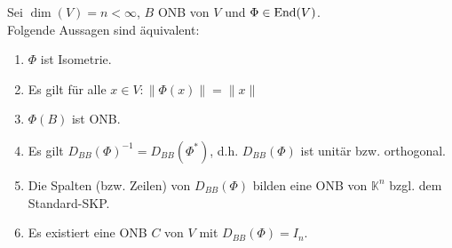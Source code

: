 \documentclass[parskip,a4paper,twoside,DIV15,BCOR12mm]{scrbook}
\begin{document}
\begin{corollary}
Sei $\dim(V)=n<\infty$, $B$ ONB von $V$ und $\Phi\in\operatorname{End}(V)$.\\
Folgende Aussagen sind äquivalent:
\begin{enumerate}
\item $\Phi$ ist Isometrie.
\item Es gilt für alle $x\in V:\|\Phi(x)\|=\|x\|$
\item $\Phi(B)$ ist ONB.
\item Es gilt $D_{BB}(\Phi)^{-1} = D_{BB}(\Phi^*)$, d.h. $D_{BB}(\Phi)$ ist unitär bzw. orthogonal.
\item Die Spalten (bzw. Zeilen) von $D_{BB}(\Phi)$ bilden eine ONB von $\mathbb{K}^n$ bzgl.
dem Standard-SKP.
\item Es existiert eine ONB $C$ von $V$ mit $D_{BB}(\Phi)=I_n$.
\end{enumerate}
\end{corollary}
\end{document}
